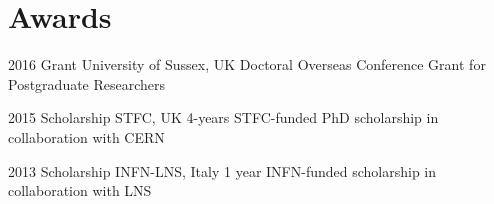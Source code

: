 \documentclass[print]{cv} %
\begin{document}
\section{Awards}

\begin{entrylist}
  \entry
      {2016}
      {Grant}
      {University of Sussex, UK}
      {Doctoral Overseas Conference Grant for Postgraduate Researchers}

  \entry
      {2015}
      {Scholarship}
      {STFC, UK}
      {4-years STFC-funded PhD scholarship in collaboration with CERN}

  \entry
      {2013}
      {Scholarship}
      {INFN-LNS, Italy}
      {1 year INFN-funded scholarship in collaboration with LNS}
\end{entrylist}



\raggedbottom
\end{document}
